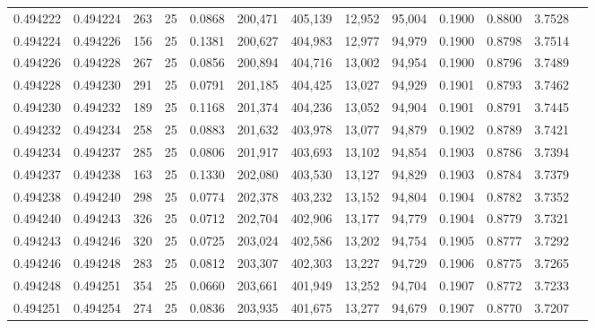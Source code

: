 \begin{tabular}{rrrrrrrrrrrrr}
0.494222 & 0.494224 &   263 &  25 &                                     0.0868 & 200,471 & 405,139 &  12,952 &  95,004 & 0.1900 & 0.8800 & 3.7528 \\
0.494224 & 0.494226 &   156 &  25 &                                     0.1381 & 200,627 & 404,983 &  12,977 &  94,979 & 0.1900 & 0.8798 & 3.7514 \\
0.494226 & 0.494228 &   267 &  25 &                                     0.0856 & 200,894 & 404,716 &  13,002 &  94,954 & 0.1900 & 0.8796 & 3.7489 \\
0.494228 & 0.494230 &   291 &  25 &                                     0.0791 & 201,185 & 404,425 &  13,027 &  94,929 & 0.1901 & 0.8793 & 3.7462 \\
0.494230 & 0.494232 &   189 &  25 &                                     0.1168 & 201,374 & 404,236 &  13,052 &  94,904 & 0.1901 & 0.8791 & 3.7445 \\
0.494232 & 0.494234 &   258 &  25 &                                     0.0883 & 201,632 & 403,978 &  13,077 &  94,879 & 0.1902 & 0.8789 & 3.7421 \\
0.494234 & 0.494237 &   285 &  25 &                                     0.0806 & 201,917 & 403,693 &  13,102 &  94,854 & 0.1903 & 0.8786 & 3.7394 \\
0.494237 & 0.494238 &   163 &  25 &                                     0.1330 & 202,080 & 403,530 &  13,127 &  94,829 & 0.1903 & 0.8784 & 3.7379 \\
0.494238 & 0.494240 &   298 &  25 &                                     0.0774 & 202,378 & 403,232 &  13,152 &  94,804 & 0.1904 & 0.8782 & 3.7352 \\
0.494240 & 0.494243 &   326 &  25 &                                     0.0712 & 202,704 & 402,906 &  13,177 &  94,779 & 0.1904 & 0.8779 & 3.7321 \\
0.494243 & 0.494246 &   320 &  25 &                                     0.0725 & 203,024 & 402,586 &  13,202 &  94,754 & 0.1905 & 0.8777 & 3.7292 \\
0.494246 & 0.494248 &   283 &  25 &                                     0.0812 & 203,307 & 402,303 &  13,227 &  94,729 & 0.1906 & 0.8775 & 3.7265 \\
0.494248 & 0.494251 &   354 &  25 &                                     0.0660 & 203,661 & 401,949 &  13,252 &  94,704 & 0.1907 & 0.8772 & 3.7233 \\
0.494251 & 0.494254 &   274 &  25 &                                     0.0836 & 203,935 & 401,675 &  13,277 &  94,679 & 0.1907 & 0.8770 & 3.7207 \\

\end{tabular}
